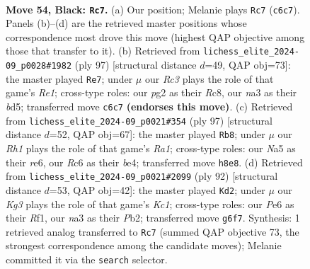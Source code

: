 \documentclass[11pt]{article}
\begin{document}
\clearpage

\begin{figure}[p]\centering
\begin{subfigure}{0.46\textwidth}\centering
\resizebox{\linewidth}{!}{%
\newchessgame
\chessboard[
  setfen={7r/p7/1pr1p1kp/n7/2P1P3/N2K4/P2B2PR/2R5 b - - 2 54},
  showmover=false,
  pgfstyle=straightmove, color=movearrow, markmove={c6-c7}
]}
\caption{}
\end{subfigure}\hfill
\begin{subfigure}{0.46\textwidth}\centering
\resizebox{\linewidth}{!}{%
\newchessgame
\chessboard[
  setfen={2r1r3/p7/1p4pk/1bnB3p/3RP2P/P3K1N1/2R3P1/8 b - - 36 49},
  showmover=false,
  pgfstyle=straightmove, color=movearrow, markmove={e8-e7}
]}
\caption{}
\end{subfigure}
\\[4pt]
\begin{subfigure}{0.46\textwidth}\centering
\resizebox{\linewidth}{!}{%
\newchessgame
\chessboard[
  setfen={r4k2/6p1/2p1Rp1n/1p4r1/3PB1PR/4PK2/8/8 b - - 4 49},
  showmover=false,
  pgfstyle=straightmove, color=movearrow, markmove={a8-b8}
]}
\caption{}
\end{subfigure}\hfill
\begin{subfigure}{0.46\textwidth}\centering
\resizebox{\linewidth}{!}{%
\newchessgame
\chessboard[
  setfen={4rr2/p5pk/2p4p/3bPP2/2p5/2N1R3/PP6/2K2R2 w - - 7 47},
  showmover=false,
  pgfstyle=straightmove, color=movearrow, markmove={c1-d2}
]}
\caption{}
\end{subfigure}
\caption{\textbf{Move 54, Black: \texttt{Rc7}.} (a) Our position; Melanie plays \texttt{Rc7} (\texttt{c6c7}). Panels (b)--(d) are the retrieved master positions whose correspondence most drove this move (highest QAP objective among those that transfer to it). (b) Retrieved from \texttt{lichess\_elite\_2024-09\_p0028\#1982} (ply 97) [structural distance $d$=49, QAP obj=73]: the master played \texttt{Re7}; under $\mu$ our \emph{Rc3} plays the role of that game's \emph{Re1}; cross-type roles: our \emph{p}g2 as their \emph{R}c8, our \emph{n}a3 as their \emph{b}d5; transferred move \texttt{c6c7} \textbf{(endorses this move)}. (c) Retrieved from \texttt{lichess\_elite\_2024-09\_p0021\#354} (ply 97) [structural distance $d$=52, QAP obj=67]: the master played \texttt{Rb8}; under $\mu$ our \emph{Rh1} plays the role of that game's \emph{Ra1}; cross-type roles: our \emph{N}a5 as their \emph{r}e6, our \emph{R}c6 as their \emph{b}e4; transferred move \texttt{h8e8}. (d) Retrieved from \texttt{lichess\_elite\_2024-09\_p0021\#2099} (ply 92) [structural distance $d$=53, QAP obj=42]: the master played \texttt{Kd2}; under $\mu$ our \emph{Kg3} plays the role of that game's \emph{Kc1}; cross-type roles: our \emph{P}e6 as their \emph{R}f1, our \emph{n}a3 as their \emph{P}b2; transferred move \texttt{g6f7}. Synthesis: 1 retrieved analog transferred to \texttt{Rc7} (summed QAP objective 73, the strongest correspondence among the candidate moves); Melanie committed it via the \texttt{search} selector.}
\label{fig:thought-m107}
\end{figure}
\end{document}
